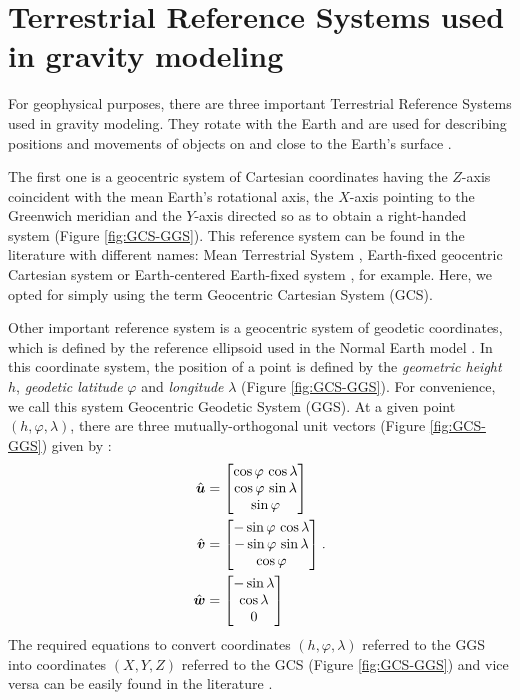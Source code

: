 \documentclass[extra]{gji}
\begin{document}
\section{Terrestrial Reference Systems used in gravity modeling}

For geophysical purposes, there are three important Terrestrial Reference Systems used in gravity modeling. 
They rotate with the Earth and are used for describing
positions and movements of objects on and close to the Earth’s surface
\citep{torge2012}.

The first one is a geocentric system of Cartesian coordinates having 
the $Z$-axis coincident with the mean Earth's rotational axis,
the $X$-axis pointing to the Greenwich meridian and the $Y$-axis
directed so as to obtain a right-handed system (Figure \ref{fig:GCS-GGS}).
This reference system can be found in the literature with different names: Mean Terrestrial System \citep[e.g.,][]{soler1976}, Earth-fixed geocentric Cartesian system \citep[e.g.,][]{torge2012} 
or Earth-centered Earth-fixed system \citep[e.g.,][]{bouman_etal2013}, for example. Here, we opted for simply using the term Geocentric Cartesian System (GCS).

Other important reference system is a geocentric system of 
geodetic coordinates, which is defined by the reference ellipsoid 
used in the Normal Earth model \citep{heiskanen-moritz1967, soler1976, 
torge2012, bouman_etal2013}. 
In this coordinate system, the position of a point 
is defined by the \textit{geometric height} $h$, 
\textit{geodetic latitude} $\varphi$ and \textit{longitude} $\lambda$ (Figure \ref{fig:GCS-GGS}).
For convenience, we call this system Geocentric Geodetic System
(GGS). 
At a given point $(h, \varphi, \lambda)$, there are three 
mutually-orthogonal unit vectors (Figure \ref{fig:GCS-GGS}) given by \citep{soler1976}:
\begin{equation}
\begin{split}
\hat{\mitbf{u}} &= 
\begin{bmatrix}
\cos\varphi \, \cos\lambda \\
\cos\varphi \, \sin\lambda \\
\sin\varphi
\end{bmatrix} \\
\hat{\mitbf{v}} &= 
\begin{bmatrix}
-\sin\varphi \, \cos\lambda \\
-\sin\varphi \, \sin\lambda \\
\cos\varphi
\end{bmatrix} \\
\hat{\mitbf{w}} &= 
\begin{bmatrix}
-\sin\lambda \\
\cos\lambda \\
0
\end{bmatrix}
\end{split} \: .
\label{eq:unit-vectors}
\end{equation}
The required equations to convert coordinates $(h, \varphi, 
\lambda)$ referred to the GGS into coordinates $(X, Y, Z)$ referred to 
the GCS (Figure \ref{fig:GCS-GGS}) and vice versa can be easily found in 
the literature \citep[e.g.,][]{heiskanen-moritz1967, torge2012, 
bouman_etal2013}.
\end{document}
